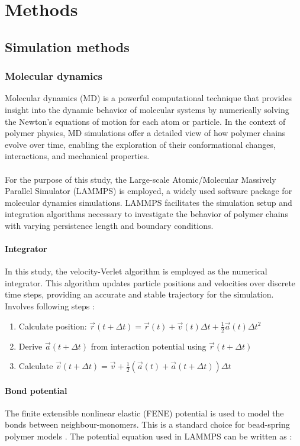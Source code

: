\documentclass[
    paper=A4,pagesize=automedia,fontsize=12pt,
    BCOR=15mm,DIV=22,
    twoside,headinclude,footinclude=false,
    ngerman,fleqn,             %
    bibliography=totocnumbered,          %
    listof=totoc,                %
    listof=flat,                 %
    cleardoublepage=empty      %
    numbers=endperiod
]{scrartcl}
\begin{document}
\section{Methods}
\subsection{Simulation methods}
\subsubsection{Molecular dynamics}
Molecular dynamics (MD) is a powerful computational technique that
provides insight into the dynamic behavior of molecular systems by 
numerically solving the Newton's equations of motion for each atom or particle. 
In the context of polymer physics, MD simulations offer a detailed view of how polymer chains evolve over time, enabling the exploration of their conformational changes, interactions, and mechanical properties.
\\
\\
For the purpose of this study, the Large-scale Atomic/Molecular Massively
Parallel Simulator (LAMMPS) \cite{LAMMPS} is employed, a widely used software package 
for molecular dynamics simulations. LAMMPS facilitates the simulation setup and 
integration algorithms necessary to investigate the behavior of 
polymer chains with varying persistence length and boundary conditions.

\paragraph{Integrator}
In this study, the velocity-Verlet algorithm is employed as the numerical integrator. 
This algorithm updates particle positions and velocities over discrete time steps,
providing an accurate and stable trajectory for the simulation.
Involves following steps \cite{10.1063/1.442716}:
\begin{enumerate}
    \item Calculate position: $\vec{r}(t+\Delta t) = \vec{r}(t) + \vec{v}(t) \Delta t + \frac{1}{2} \vec{a}(t) \Delta{t}^2$
    \item Derive $\vec{a}(t+\Delta t)$ from interaction potential using $\vec{r}(t+\Delta t)$
    \item Calculate $\vec{v}(t+\Delta t) = \vec{v} + \frac{1}{2}(\vec{a}(t) + \vec{a}(t+\Delta t))\Delta t$ 
\end{enumerate}

\paragraph{Bond potential}
\label{par:bond_potential}
The finite extensible nonlinear elastic (FENE) potential \cite{Kremer_ChemPhys} 
is used to model the bonds between neighbour-monomers. This is a standard 
choice for bead-spring polymer models \cite{LAMMPS}. The potential equation used in
LAMMPS can be written as \cite{LAMMPS}:
\end{document}
